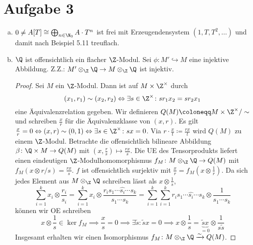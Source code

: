 \documentclass{article}
\begin{document}
\section*{Aufgabe 3}
\begin{enumerate}[(a)]
    \item $0 \neq A[T] \cong \bigoplus_{n\in \N_0} A\cdot T^n$ ist frei mit Erzeugendensystem $(1, T, T^2, \dots)$ und damit nach Beispiel 5.11 treuflach.
    \item $\Q$ ist offensichtlich ein flacher $\Z$-Modul.
    Sei $\phi\colon M' \hookrightarrow M$ eine injektive Abbildung. Z.Z.: $M' \otimes_\Z \Q \to M \otimes_\Z \Q$ ist injektiv.
    \begin{proof}
        Sei $M$ ein $\Z$-Modul. Dann ist auf $M \times \Z^\times$ durch 
        $$(x_1, r_1) \sim (x_2, r_2) \Leftrightarrow \exists s \in \Z^\times\colon sr_1x_2 = sr_2x_1$$
        eine Äquivalenzrelation gegeben. Wir definieren $Q(M) \coloneqq M \times \Z^\times /\sim$ und schreiben $\frac{x}{r}$ für 
        die Äquivalenzklasse von $(x,r)$. Es gilt $\frac{x}{r} = 0 \Leftrightarrow (x,r) \sim (0,1) \Leftrightarrow \exists s\in \Z^\times\colon sx = 0$.
        Via $r\cdot \frac{x}{t} \coloneqq \frac{rx}{t}$ wird $Q(M)$ zu einem $\Z$-Modul.
        Betrachte die offensichtlich bilineare Abbildung $\beta\colon \Q \times M \to Q(M)$ mit $\left(x, \frac{r}{s}\right) \mapsto \frac{rx}{s}$.
        Die UE des Tensorprodukts liefert einen eindeutigen $\Z$-Modulhomomorphismus $f_M \colon M \otimes_\Z \Q \to Q(M)$ mit $f_M(x \otimes r/s) = \frac{rx}{s}$.
        $f$ ist offensichtlich surjektiv mit $\frac{x}{r} = f_M\left( x \otimes \frac{1}{r} \right)$.
        Da sich jedes Element aus $M \otimes_\Z \Q$ schreiben lässt als $x \otimes \frac{1}{s}$,
        $$\sum_{i = 1}^{k} x_i \otimes \frac{r_i}{s_i} = \sum_{i = 1}^{k} x_i \otimes \frac{r_is_1\cdots\widehat{s_i}\cdots s_k}{s_1\cdots s_k} = \sum_{i = 1}^{k} \sum_{i = 1}^{k} r_is_1\cdots\widehat{s_i}\cdots s_k \otimes \frac{1}{s_1\cdots s_k}$$ 
        können wir OE schreiben 
        $$x\otimes \frac{1}{s} \in \ker f_M \implies \frac{x}{s} = 0 \implies \exists \tilde s \colon \tilde s x = 0 \implies x \otimes \frac{1}{s} = \underbrace{\tilde s x}_{= 0} \otimes \frac{1}{s\tilde s}$$
        Insgesamt erhalten wir einen Isomorphismus $f_M\colon M \otimes_\Z \Q \xrightarrow{\sim} Q(M)$. 


\end{proof}
\end{enumerate}
\end{document}
